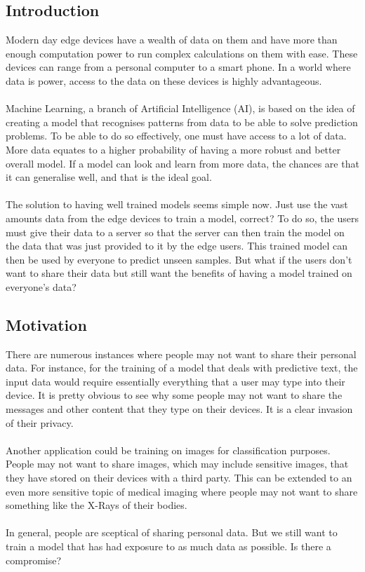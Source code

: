 \documentclass[10pt]{article}
\begin{document}
\subsection{Introduction}
Modern day edge devices have a wealth of data on them and have more than enough computation power to run complex calculations on them with ease. These devices can range from a personal computer to a smart phone. In a world where data is power, access to the data on these devices is highly advantageous.
\\\\
Machine Learning, a branch of Artificial Intelligence (AI), is based on the idea of creating a model that recognises patterns from data to be able to solve prediction problems. To be able to do so effectively, one must have access to a lot of data. More data equates to a higher probability of having a more robust and better overall model. If a model can look and learn from more data, the chances are that it can generalise well, and that is the ideal goal. 
\\\\
The solution to having well trained models seems simple now. Just use the vast amounts data from the edge devices to train a model, correct? To do so, the users must give their data to a server so that the server can then train the model on the data that was just provided to it by the edge users. This trained model can then be used by everyone to predict unseen samples. But what if the users don't want to share their data but still want the benefits of having a model trained on everyone's data?
\subsection{Motivation}
There are numerous instances where people may not want to share their personal data. For instance, for the training of a model that deals with predictive text, the input data would require essentially everything that a user may type into their device. It is pretty obvious to see why some people may not want to share the messages and other content that they type on their devices. It is a clear invasion of their privacy.
\\\\
Another application could be training on images for classification purposes. People may not want to share images, which may include sensitive images, that they have stored on their devices with a third party. This can be extended to an even more sensitive topic of medical imaging where people may not want to share something like the X-Rays of their bodies.
\\\\
In general, people are sceptical of sharing personal data. But we still want to train a model that has had exposure to as much data as possible. Is there a compromise?
\end{document}

